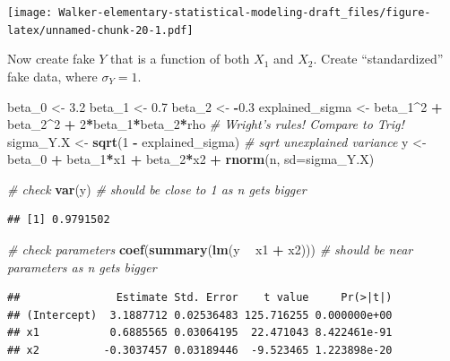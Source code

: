 \documentclass[]{book}
\newenvironment{Shaded}{\begin{snugshade}}{\end{snugshade}}
\newcommand{\KeywordTok}[1]{\textcolor[rgb]{0.13,0.29,0.53}{\textbf{#1}}}
\newcommand{\DataTypeTok}[1]{\textcolor[rgb]{0.13,0.29,0.53}{#1}}
\newcommand{\DecValTok}[1]{\textcolor[rgb]{0.00,0.00,0.81}{#1}}
\newcommand{\FloatTok}[1]{\textcolor[rgb]{0.00,0.00,0.81}{#1}}
\newcommand{\StringTok}[1]{\textcolor[rgb]{0.31,0.60,0.02}{#1}}
\newcommand{\CommentTok}[1]{\textcolor[rgb]{0.56,0.35,0.01}{\textit{#1}}}
\newcommand{\OperatorTok}[1]{\textcolor[rgb]{0.81,0.36,0.00}{\textbf{#1}}}
\newcommand{\NormalTok}[1]{#1}
\begin{document}
\texttt{[image: Walker-elementary-statistical-modeling-draft\_files/figure-latex/unnamed-chunk-20-1.pdf]}

Now create fake \(Y\) that is a function of both \(X_1\) and \(X_2\).
Create ``standardized'' fake data, where \(\sigma_Y = 1\).

\begin{Shaded}
\begin{Highlighting}[]
\NormalTok{beta_}\DecValTok{0}\NormalTok{ <-}\StringTok{ }\FloatTok{3.2}
\NormalTok{beta_}\DecValTok{1}\NormalTok{ <-}\StringTok{ }\FloatTok{0.7}
\NormalTok{beta_}\DecValTok{2}\NormalTok{ <-}\StringTok{ }\OperatorTok{-}\FloatTok{0.3}
\NormalTok{explained_sigma <-}\StringTok{ }\NormalTok{beta_}\DecValTok{1}\OperatorTok{^}\DecValTok{2} \OperatorTok{+}\StringTok{ }\NormalTok{beta_}\DecValTok{2}\OperatorTok{^}\DecValTok{2} \OperatorTok{+}\StringTok{ }\DecValTok{2}\OperatorTok{*}\NormalTok{beta_}\DecValTok{1}\OperatorTok{*}\NormalTok{beta_}\DecValTok{2}\OperatorTok{*}\NormalTok{rho }\CommentTok{# Wright's rules! Compare to Trig!}
\NormalTok{sigma_Y.X <-}\StringTok{ }\KeywordTok{sqrt}\NormalTok{(}\DecValTok{1} \OperatorTok{-}\StringTok{ }\NormalTok{explained_sigma) }\CommentTok{# sqrt unexplained variance}
\NormalTok{y <-}\StringTok{ }\NormalTok{beta_}\DecValTok{0} \OperatorTok{+}\StringTok{ }\NormalTok{beta_}\DecValTok{1}\OperatorTok{*}\NormalTok{x1 }\OperatorTok{+}\StringTok{ }\NormalTok{beta_}\DecValTok{2}\OperatorTok{*}\NormalTok{x2 }\OperatorTok{+}\StringTok{ }\KeywordTok{rnorm}\NormalTok{(n, }\DataTypeTok{sd=}\NormalTok{sigma_Y.X)}

\CommentTok{# check}
\KeywordTok{var}\NormalTok{(y) }\CommentTok{# should be close to 1 as n gets bigger}
\end{Highlighting}
\end{Shaded}

\begin{verbatim}
## [1] 0.9791502
\end{verbatim}

\begin{Shaded}
\begin{Highlighting}[]
\CommentTok{# check parameters}
\KeywordTok{coef}\NormalTok{(}\KeywordTok{summary}\NormalTok{(}\KeywordTok{lm}\NormalTok{(y }\OperatorTok{~}\StringTok{ }\NormalTok{x1 }\OperatorTok{+}\StringTok{ }\NormalTok{x2))) }\CommentTok{# should be near parameters as n gets bigger}
\end{Highlighting}
\end{Shaded}

\begin{verbatim}
##               Estimate Std. Error    t value     Pr(>|t|)
## (Intercept)  3.1887712 0.02536483 125.716255 0.000000e+00
## x1           0.6885565 0.03064195  22.471043 8.422461e-91
## x2          -0.3037457 0.03189446  -9.523465 1.223898e-20
\end{verbatim}
\end{document}
